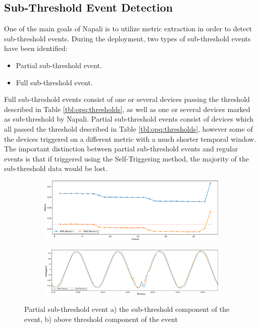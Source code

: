 \subsection{Sub-Threshold Event Detection}\label{subsec:sub-threshold-event-detection}

One of the main goals of Napali is to utilize metric extraction in order to detect sub-threshold events.
During the deployment, two types of sub-threshold events have been identified:
\begin{itemize}
    \item Partial sub-threshold event.
    \item Full sub-threshold event.
\end{itemize}
Full sub-threshold events consist of one or several devices passing the threshold described in Table \ref{tbl:opq:thresholds},
as well as one or several devices marked as sub-threshold by Napali.
Partial sub-threshold events consist of devices which all passed the threshold described in Table \ref{tbl:opq:thresholds}, however some of the devices triggered on a different metric with a much shorter temporal window.
The important distinction between partial sub-threshold events and regular events is that if triggered using the Self-Triggering method, the majority of the sub-threshold data would be lost.

\begin{figure}[h]
    \centering
    \begin{subfigure}{1\textwidth}
        \centering
        \includegraphics[width=1\linewidth]{img/napali_eval/rms_gridwide_subthreshold.pdf}
        \caption{}
        \label{fig:expdes:8:1}
    \end{subfigure}%

    \begin{subfigure}{1\textwidth}
        \centering
        \includegraphics[width=1\linewidth]{img/napali_eval/raw_gridwide_subthreshold_zoom.pdf}
        \caption{}
        \label{fig:expdes:8:2}
    \end{subfigure}
    \caption{Partial sub-threshold event a) the sub-threshold component of the event, b) above threshold component of the event}
    \label{fig:expdes:8}
\end{figure}

